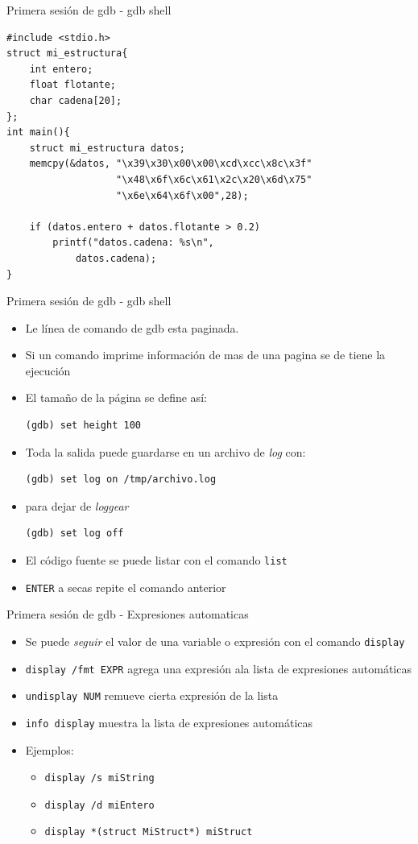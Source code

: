 \documentclass[xetex]{beamer}
\begin{document}
\begin{frame}[fragile]{Primera sesión de gdb - gdb shell}
\begin{lstlisting}
#include <stdio.h>
struct mi_estructura{
    int entero;
    float flotante;
    char cadena[20];
};
int main(){
    struct mi_estructura datos;
    memcpy(&datos, "\x39\x30\x00\x00\xcd\xcc\x8c\x3f"
                   "\x48\x6f\x6c\x61\x2c\x20\x6d\x75"
                   "\x6e\x64\x6f\x00",28);

    if (datos.entero + datos.flotante > 0.2)
	    printf("datos.cadena: %s\n",
	        datos.cadena);
}
\end{lstlisting}
\end{frame}
\begin{frame}[fragile]{Primera sesión de gdb - gdb shell}
\begin{itemize}
\item Le línea de comando de gdb esta paginada.
\item Si un comando imprime información de mas de una pagina se de tiene la ejecución
\item El tamaño de la página se define así:
\begin{verbatim}
(gdb) set height 100
\end{verbatim}
\item Toda la salida puede guardarse en un archivo de {\it log} con:
\begin{verbatim}
(gdb) set log on /tmp/archivo.log
\end{verbatim}
\item para dejar de {\it loggear}
\begin{verbatim}
(gdb) set log off
\end{verbatim}
\item El código fuente se puede listar con el comando \verb=list=
\item \verb=ENTER= a secas repite el comando anterior
\end{itemize}
\end{frame}

\begin{frame}[fragile]{Primera sesión de gdb - Expresiones automaticas}
\begin{itemize}
\item Se puede {\it seguir} el valor de una variable o expresión con el comando \verb-display-
\item \verb=display /fmt EXPR= agrega una expresión ala lista de expresiones automáticas
\item \verb=undisplay NUM= remueve cierta expresión de la lista
\item \verb=info display= muestra la lista de expresiones automáticas
\item Ejemplos:
\begin{itemize}
\item \verb=display /s miString=
\item \verb=display /d miEntero=
\item \verb=display *(struct MiStruct*) miStruct=
\end{itemize}
\end{itemize}
\end{frame}
\end{document}
